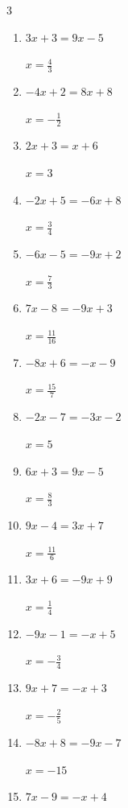 \begin{multicols}{3}
\begin{enumerate}
\columnbreak %

  \item $3x+3=9x-5$

        $\displaystyle x=\frac{4}{3}$

  \item $-4x+2=8x+8$

        $\displaystyle x=-\frac{1}{2}$

  \item $2x+3=x+6$

        $\displaystyle x=3$

  \item $-2x+5=-6x+8$

        $\displaystyle x=\frac{3}{4}$

  \item $-6x-5=-9x+2$

        $\displaystyle x=\frac{7}{3}$

  \item $7x-8=-9x+3$

        $\displaystyle x=\frac{11}{16}$

  \item $-8x+6=-x-9$

        $\displaystyle x=\frac{15}{7}$

  \item $-2x-7=-3x-2$

        $\displaystyle x=5$

  \item $6x+3=9x-5$

        $\displaystyle x=\frac{8}{3}$

  \item $9x-4=3x+7$

        $\displaystyle x=\frac{11}{6}$

  \item $3x+6=-9x+9$

        $\displaystyle x=\frac{1}{4}$

  \item $-9x-1=-x+5$

        $\displaystyle x=-\frac{3}{4}$

  \item $9x+7=-x+3$

        $\displaystyle x=-\frac{2}{5}$

  \item $-8x+8=-9x-7$

        $\displaystyle x=-15$

  \item $7x-9=-x+4$


\end{enumerate}
\end{multicols}

